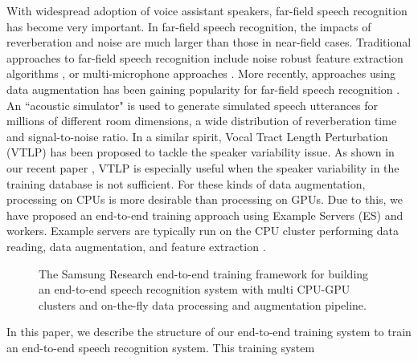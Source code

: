 \documentclass{article}
\begin{document}
With widespread adoption of voice assistant speakers, far-field
speech recognition has become very important.
In far-field speech recognition, the impacts of reverberation and noise 
are much larger than those in near-field cases. 
Traditional approaches to far-field
speech recognition include noise robust feature extraction algorithms
\cite{C_Kim_IEEETran_2016_1, U_H_Yapanel_SpeechComm_2008, c_kim_interspeech_2014_00},
or multi-microphone approaches
\cite{T_Nekatani_ICASSP_2017_1, T_Higuchi_ICASSP_2016_1,
H_Erdogan_INTERSPEECH_2016_1,
C_Kim_INTERSPEECH_2010_1, C_Kim_ICASSP_2012_2, C_Kim_INTERSPEECH_2015_1, c_kim_icassp_2018_01}.
More recently, approaches using data augmentation
has been gaining popularity for far-field speech recognition
\cite{R_Lippmann_icassp_1987_1,
c_kim_icassp_2018_00, w_hartmann_interspeech_2016_00, 
s_park_interspeech_2019_00, C_Kim_ASRU_2009_2}. 
An ``acoustic simulator"  
\cite{c_kim_interspeech_2017_00, c_kim_interspeech_2018_00}
is used to generate simulated speech utterances for
millions of different room dimensions, a wide distribution
of reverberation time and signal-to-noise ratio. In a similar 
spirit, Vocal Tract Length Perturbation (VTLP) has been proposed 
\cite{n_jaitly_icml_workshop_2013_00} to tackle the speaker variability issue.
As shown in our recent paper \cite{c_kim_interspeech_2019_00}, 
VTLP is especially useful when
the speaker variability in the training database is not sufficient. 
For these kinds of data augmentation, processing on CPUs is more
desirable than processing on GPUs. Due to this, we have proposed
an end-to-end training approach using Example Servers (ES)
 and workers. Example servers are typically run on the CPU
cluster performing data reading, data augmentation, and feature extraction
\cite{E_Variani_INTERSPEECH_2017_01, c_kim_interspeech_2018_00}.
%
%
%
\begin{figure}[!tbp]
  \begin{center}
    \resizebox{\textwidth}{!}{}
      \caption { The Samsung Research end-to-end training framework for building an end-to-end
	speech recognition system with multi CPU-GPU clusters and on-the-fly data
	processing and augmentation pipeline.
     }   
     \label{fig:end_to_end_training_system}
  \end{center}
\vspace{-5mm}
\end{figure}
%
%
%
In this paper, we describe the structure of our end-to-end training system
to train an end-to-end speech recognition system. This training system
\end{document}
